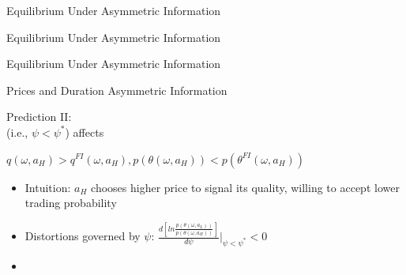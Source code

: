 \documentclass[english,xcolor=svgnames,aspectratio=169]{beamer}
\begin{document}
\begin{frame}{Equilibrium Under Asymmetric Information}
\begin{figure}
\end{figure}
\end{frame}

\begin{frame}{Equilibrium Under Asymmetric Information}
\begin{figure}
\end{figure}
\end{frame}


\begin{frame}{Equilibrium Under Asymmetric Information}
\end{frame}


\begin{frame}{Prices and Duration Asymmetric Information}\label{main:asym_info}

Prediction II: \\

{\color{dred}{\bf AI}} (i.e., $\psi<\psi^*$) affects {\color{dblue}{terms of trade of high-quality capital}} \\ \smallskip

$q(\omega,a_{H})>q^{FI}(\omega,a_{H}), p\left(\theta(\omega,a_{H})\right)<p\left(\theta^{FI}(\omega,a_{H})\right)$
\bigskip


\begin{itemize}
\item {\color{dblue}Intuition}: $a_H$ chooses higher price to signal its quality, willing to accept lower trading probability \medskip
\item Distortions governed by $\psi$: $\frac{ d\left[ln \frac{p(\theta(\omega,a_L))}{p(\theta(\omega,a_H)) } \right] }{d\psi}\Big|_{\psi < \psi^*} < 0$\medskip
\item {\bf{\color{dblue}{Relationship between prices and duration is informative about $\psi$}}}
\end{itemize}

\end{frame}









\end{document}
